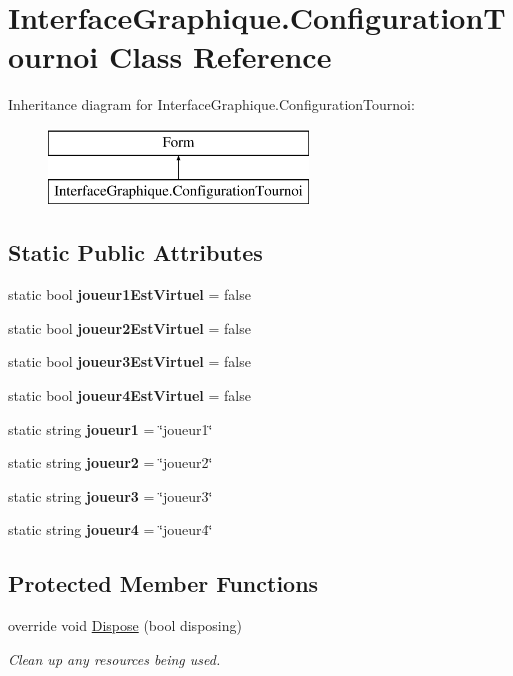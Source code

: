 \hypertarget{class_interface_graphique_1_1_configuration_tournoi}{}\section{Interface\+Graphique.\+Configuration\+Tournoi Class Reference}
\label{class_interface_graphique_1_1_configuration_tournoi}
Inheritance diagram for Interface\+Graphique.\+Configuration\+Tournoi\+:\begin{figure}[H]
\begin{center}
\leavevmode
\includegraphics[height=2.000000cm]{class_interface_graphique_1_1_configuration_tournoi}
\end{center}
\end{figure}
\subsection*{Static Public Attributes}
\begin{DoxyCompactItemize}
\item 
static bool {\bfseries joueur1\+Est\+Virtuel} = false
\item 
static bool {\bfseries joueur2\+Est\+Virtuel} = false
\item 
static bool {\bfseries joueur3\+Est\+Virtuel} = false
\item 
static bool {\bfseries joueur4\+Est\+Virtuel} = false
\item 
static string {\bfseries joueur1} = \char`\"{}joueur1\char`\"{}
\item 
static string {\bfseries joueur2} = \char`\"{}joueur2\char`\"{}
\item 
static string {\bfseries joueur3} = \char`\"{}joueur3\char`\"{}
\item 
static string {\bfseries joueur4} = \char`\"{}joueur4\char`\"{}
\end{DoxyCompactItemize}
\subsection*{Protected Member Functions}
\begin{DoxyCompactItemize}
\item 
override void \hyperlink{class_interface_graphique_1_1_configuration_tournoi_ad801e75807538977aa896ae679e403ec}{Dispose} (bool disposing)
\begin{DoxyCompactList}\small\item\em Clean up any resources being used. \end{DoxyCompactList}\end{DoxyCompactItemize}


